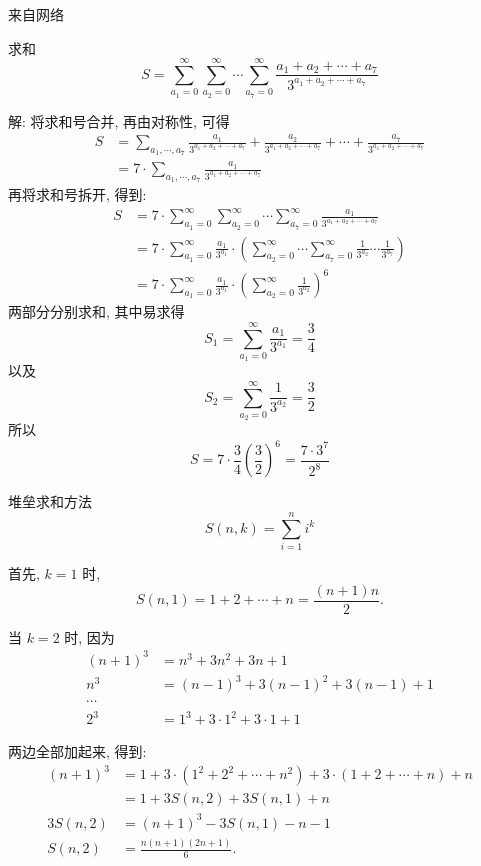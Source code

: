\newpage

\noindent 来自网络

求和
\[ 
S = \sum_{a_1=0}^{\infty}\sum_{a_2=0}^{\infty}\cdots\sum_{a_7=0}^{\infty}{\frac{a_1+a_2+\cdots+a_7}{3^{a_1+a_2+\cdots+a_7}}}
\]

解: 将求和号合并, 再由对称性, 可得
\begin{align*}
S &= \sum_{a_1,\cdots,a_7} {\frac{a_1}{3^{a_1+a_2+\cdots+a_7}} + \frac{a_2}{3^{a_1+a_2+\cdots+a_7}} + \cdots + \frac{a_7}{3^{a_1+a_2+\cdots+a_7}}} \\
 &= 7\cdot\sum_{a_1,\cdots,a_7} {\frac{a_1}{3^{a_1+a_2+\cdots+a_7}}}
\end{align*}
再将求和号拆开, 得到:
\begin{align*}
S &= 7\cdot \sum_{a_1=0}^{\infty}\sum_{a_2=0}^{\infty}\cdots\sum_{a_7=0}^{\infty}{\frac{a_1}{3^{a_1+a_2+\cdots+a_7}}} \\
&=  7\cdot \sum_{a_1=0}^{\infty}\frac{a_1}{3^{a_1}}\cdot\left(\sum_{a_2=0}^{\infty}\cdots\sum_{a_7=0}^{\infty}{\frac{1}{3^{a_2}}\cdots\frac{1}{3^{a_7}}}\right)\\
&= 7\cdot \sum_{a_1=0}^{\infty}\frac{a_1}{3^{a_1}}\cdot\left(\sum_{a_2=0}^{\infty}{\frac{1}{3^{a_2}}}\right)^6
\end{align*}
两部分分别求和, 其中易求得
\[
S_1 = \sum_{a_1=0}^{\infty}\frac{a_1}{3^{a_1}} = \frac{3}{4}
\]
以及 
\[ S_2 = \sum_{a_2=0}^{\infty}\frac{1}{3^{a_2}} = \frac{3}{2}
\]
所以 
\[
S = 7\cdot\frac{3}{4}(\frac{3}{2})^6 = \frac{7\cdot 3^7}{2^8}
\]


\newpage

\noindent 堆垒求和方法
\[ S(n,k) = \sum_{i=1}^{n}{i^k} \]

首先, $ k = 1 $ 时, \[ S(n,1) = 1 + 2 + \cdots + n = \frac{(n+1)n}{2} .\]

当 $ k = 2 $ 时, 因为
\begin{align*}
(n+1)^3 &= n^3 + 3n^2 + 3n + 1 \\ 
n^3 &= (n-1)^3 + 3(n-1)^2 + 3(n-1) + 1\\
\cdots & \\
 2^3 &= 1^3 + 3\cdot 1^2 + 3\cdot 1 + 1
\end{align*}

两边全部加起来, 得到: 
\begin{align*} 
(n+1)^3 &= 1 + 3\cdot(1^2+2^2+\cdots+n^2) + 3\cdot(1+2+\cdots+n) + n \\
	&= 1 + 3S(n,2) + 3S(n,1) + n\\
3S(n,2) &= (n+1)^3 - 3S(n,1) - n - 1 \\
	S(n,2) &= \frac{n(n+1)(2n+1)}{6} .
\end{align*}

